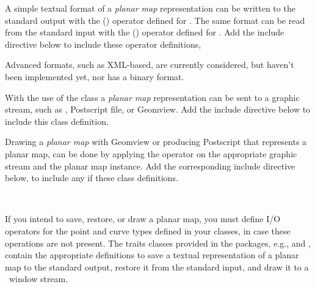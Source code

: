 A simple textual format of a {\em planar map} representation can be
written to the standard output with the  (\ccc{ >> })
operator defined for . The same format can be read
from the standard input with the  (\ccc{ << }) operator
defined for . Add the include directive below to
include these operator definitions,


Advanced formats, such as XML-based, are currently considered, but
haven't been implemented yet, nor has a binary format.

With the use of the  class a {\em planar map}
representation can be sent to a graphic stream, such as
, Postscript file, or Geomview. Add the include
directive below to include this class definition.


Drawing a {\em planar map} with Geomview or producing Postscript that
represents a planar map, can be done by applying the 
operator on the appropriate graphic stream and the planar map
instance. Add the corresponding include directive below, to include
any if these class definitions.

\\


If you intend to save, restore, or draw a planar map, you must
define I/O operators for the point and curve types defined in your
 classes, in case these operations are not present. The
traits classes provided in the  packages, e.g.,
 and ,
contain the appropriate definitions to save a textual representation
of a planar map to the standard output, restore it from the standard 
input, and draw it to a \cgal\ window stream.


